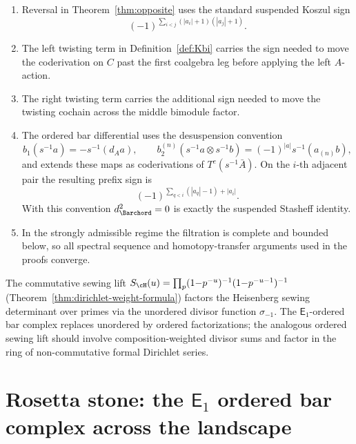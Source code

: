 \begin{enumerate}[label=(\arabic*)]
\item Reversal in Theorem~\ref{thm:opposite} uses the standard suspended Koszul sign
\[
(-1)^{\sum_{i<j}(|a_i|+1)(|a_j|+1)}.
\]

\item The left twisting term in Definition~\ref{def:Kbi} carries the sign needed to move the
coderivation on $C$ past the first coalgebra leg before applying the left $A$-action.

\item The right twisting term carries the additional sign needed to move the twisting cochain across
the middle bimodule factor.

\item The ordered bar differential uses the desuspension convention
\[
b_1(s^{-1}a)=-s^{-1}(d_Aa),\qquad
b_2^{(n)}(s^{-1}a\otimes s^{-1}b)
=(-1)^{|a|}s^{-1}(a_{(n)}b),
\]
and extends these maps as coderivations of $T^c(s^{-1}\bar A)$.
On the $i$-th adjacent pair the resulting prefix sign is
\[
(-1)^{\sum_{q<i}(|a_q|-1)+|a_i|}.
\]
With this convention \(d_{\Barchord}^2=0\) is exactly the suspended
Stasheff identity.

\item In the strongly admissible regime the filtration is complete and bounded below, so all spectral
sequence and homotopy-transfer arguments used in the proofs converge.
\end{enumerate}

\begin{remark}%
\label{rem:e1-noncommutative-euler}%
The commutative sewing lift
$S_\cH(u) = \prod_p(1{-}p^{-u})^{-1}(1{-}p^{-u-1})^{-1}$
(Theorem~\ref{thm:dirichlet-weight-formula})
factors the Heisenberg sewing determinant over primes
via the unordered divisor function $\sigma_{-1}$.
The $\mathsf{E}_1$-ordered bar complex replaces
unordered by ordered factorizations; the analogous
ordered sewing lift should involve composition-weighted
divisor sums and factor in the ring of non-commutative
formal Dirichlet series.
\end{remark}


\section{Rosetta stone: the $\mathsf{E}_1$ ordered bar complex across the landscape}
\label{sec:e1-rosetta-stone}

